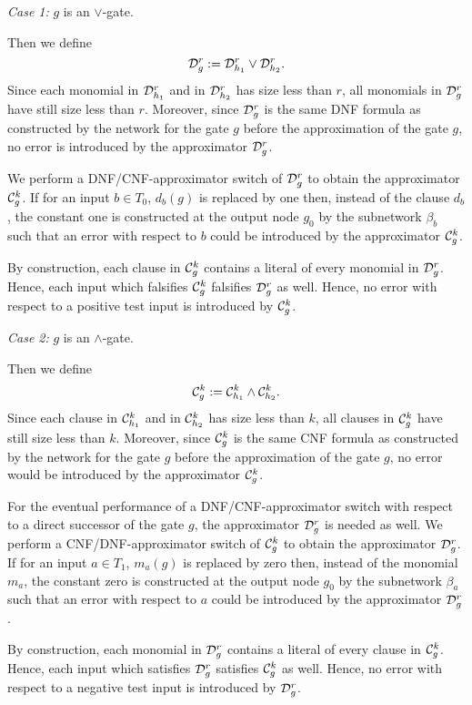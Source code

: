 \documentclass[11pt]{article}
\begin{document}
\smallskip
\noindent
{\em Case 1:\/} $g$ is an $\vee$-gate.

\smallskip
Then we define
$$
{\cal D}_g^r := {\cal D}_{h_1}^r \vee {\cal D}_{h_2}^r.
$$
Since each monomial in ${\cal D}_{h_1}^r$ and in ${\cal D}_{h_2}^r$ has size less than $r$, all monomials in
${\cal D}_g^r$ have still size less than $r$. Moreover, since ${\cal D}_g^r$ is the same DNF formula as constructed
by the network for the gate $g$ before the approximation of the gate $g$, no error is introduced by the
approximator ${\cal D}_g^r$.

We perform a DNF/CNF-approximator switch of ${\cal D}_g^r$  to obtain the approximator ${\cal C}_g^k$.
If for an input $b \in T_0$, $d_b(g)$ is replaced by one then, instead of the clause
$d_b$, the constant one is constructed at the output node $g_0$ by the subnetwork $\beta_b$ such that an error with
respect to $b$ could be introduced by the approximator ${\cal C}_g^k$.

By construction, each clause in ${\cal C}_g^k$ contains a literal of every monomial in ${\cal D}_g^r$. Hence, each
input which falsifies ${\cal C}_g^k$ falsifies ${\cal D}_g^r$ as well. Hence, no error with respect to a positive
test input is introduced by ${\cal C}_g^k$.

\smallskip
\noindent
{\em Case 2:\/} $g$ is an $\wedge$-gate.

\smallskip
Then we define
$$
{\cal C}_g^k := {\cal C}_{h_1}^k \wedge {\cal C}_{h_2}^k.
$$
Since each clause in ${\cal C}_{h_1}^k$ and in ${\cal C}_{h_2}^k$ has size less than $k$, all clauses in ${\cal C}_g^k$
have still size less than $k$. Moreover, since ${\cal C}_g^k$ is the same CNF formula as constructed by the network
for the gate $g$ before the approximation of the gate $g$, no error would be introduced by the approximator
${\cal C}_g^k$.

For the eventual performance of a DNF/CNF-approximator switch with respect to a direct successor of the gate $g$,
the approximator ${\cal D}_g^r$ is needed as well.
We perform a CNF/DNF-approximator switch of ${\cal C}_g^k$ to obtain the approximator ${\cal D}_g^r$.
If for an input $a \in T_1$, $m_a(g)$ is replaced by zero then, instead of the monomial $m_a$, the constant zero is
constructed at the output node $g_0$ by the subnetwork $\beta_a$ such that an error with respect to $a$ could be
introduced by the approximator ${\cal D}_g^r$.

By construction, each monomial in ${\cal D}_g^r$ contains a literal of every clause in ${\cal C}_g^k$. Hence, each
input which satisfies ${\cal D}_g^r$ satisfies ${\cal C}_g^k$ as well. Hence, no error with respect to a negative
test input is introduced by ${\cal D}_g^r$.
\end{document}
